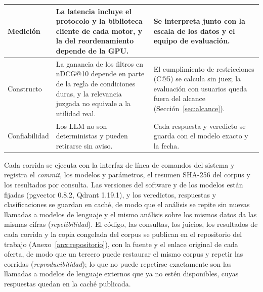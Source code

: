 \begin{table}[!htb]
\begin{tabular}{|p{2cm}|p{6.3cm}|p{5.9cm}|}
        \hline
        Medición & La latencia incluye el protocolo y la biblioteca cliente de cada motor, y la del reordenamiento depende de la GPU. & Se interpreta junto con la escala de los datos y el equipo de evaluación. \\
        \hline
        Constructo & La ganancia de los filtros en nDCG@10 depende en parte de la regla de condiciones duras, y la relevancia juzgada no equivale a la utilidad real. & El cumplimiento de restricciones (C@5) se calcula sin juez; la evaluación con usuarios queda fuera del alcance (Sección~\ref{sec:alcance}). \\
        \hline
        Confiabilidad & Los LLM no son deterministas y pueden retirarse sin aviso. & Cada respuesta y veredicto se guarda con el modelo exacto y la fecha. \\
        \hline
    \end{tabular}
\end{table}

Cada corrida se ejecuta con la interfaz de línea de comandos del sistema y registra el \textit{commit}, los modelos y parámetros, el resumen SHA-256 del corpus y los resultados por consulta. Las versiones del software y de los modelos están fijadas (pgvector 0.8.2, Qdrant 1.19.1), y los veredictos, respuestas y clasificaciones se guardan en caché, de modo que el análisis se repite sin nuevas llamadas a modelos de lenguaje y el mismo análisis sobre los mismos datos da las mismas cifras (\emph{repetibilidad}). El código, las consultas, los juicios, los resultados de cada corrida y la copia congelada del corpus se publican en el repositorio del trabajo (Anexo~\ref{anx:repositorio}), con la fuente y el enlace original de cada oferta, de modo que un tercero puede restaurar el mismo corpus y repetir las corridas (\emph{reproducibilidad}); lo que no puede repetirse exactamente son las llamadas a modelos de lenguaje externos que ya no estén disponibles, cuyas respuestas quedan en la caché publicada.
